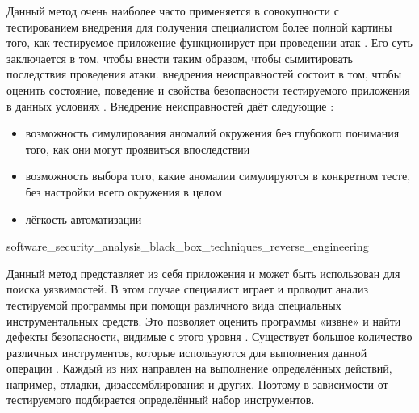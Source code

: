 %
Данный метод очень наиболее часто применяется в совокупности с тестированием внедрения для получения специалистом более полной картины того, как тестируемое приложение функционирует при проведении атак . 
%
Его суть заключается в том, чтобы внести  таким образом, чтобы сымитировать последствия проведения атаки. 
%
 внедрения неисправностей состоит в том, чтобы оценить состояние, поведение и свойства безопасности тестируемого приложения в данных условиях . 
%
Внедрение неисправностей даёт следующие  : 
\begin{itemize}
	\leftskip2em%
	\setlength{\itemsep}{0pt}%
	\setlength{\parsep}{0pt}%

	\item возможность симулирования аномалий окружения без глубокого понимания того, как они могут проявиться впоследствии

	\item возможность выбора того, какие аномалии симулируются в конкретном тесте, без настройки всего окружения в целом

	\item лёгкость автоматизации
\end{itemize}


	{software_security_analysis_black_box_techniques_reverse_engineering}

%
Данный метод представляет из себя  приложения и может быть использован для поиска уязвимостей. 
%
В этом случае специалист играет  и проводит анализ тестируемой программы при помощи различного вида специальных инструментальных средств. 
%
Это позволяет оценить  программы «извне» и найти дефекты безопасности, видимые с этого уровня . 
%
Существует большое количество различных инструментов, которые используются для выполнения данной операции . 
%
Каждый из них направлен на выполнение определённых действий, например, отладки, дизассемблирования и других. 
%
Поэтому в зависимости от тестируемого  подбирается определённый набор инструментов.

